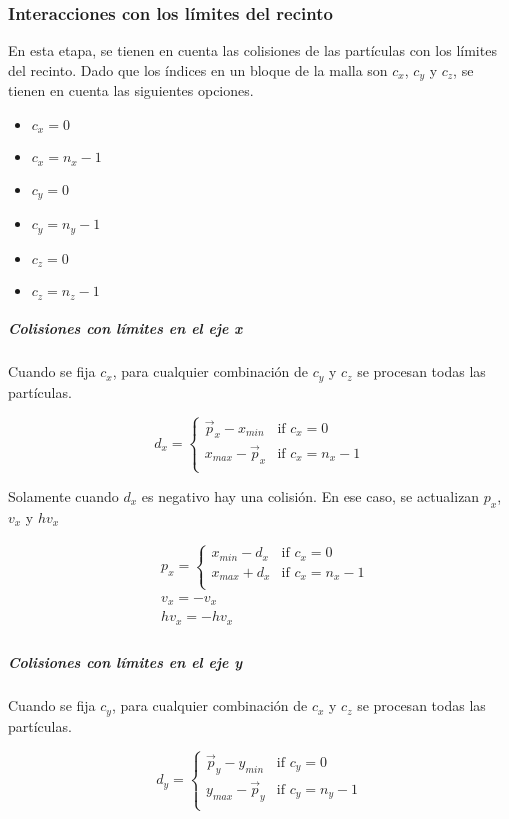 \subsubsection{Interacciones con los límites del recinto}

En esta etapa, se tienen en cuenta las colisiones de las partículas con
los límites del recinto. Dado que los índices en un bloque de la malla
son $c_x$, $c_y$ y $c_z$, se tienen en cuenta las siguientes opciones.

\begin{itemize}
\item $c_x=0$
\item $c_x=n_x-1$
\item $c_y=0$
\item $c_y=n_y-1$
\item $c_z=0$
\item $c_z=n_z-1$
\end{itemize}

\subparagraph{Colisiones con límites en el eje x}

Cuando se fija $c_x$, 
para cualquier combinación de $c_y$ y $c_z$ se procesan todas
las partículas.

\[
d_x =
\begin{cases}
  \vec{p}_x -x_{min}  & \text{if } c_x = 0\\
  x_{max} - \vec{p}_x & \text{if } c_x = n_x - 1\\
\end{cases}
\]

Solamente cuando $d_x$ es negativo hay una colisión. En ese caso, se actualizan
$p_x$, $v_x$ y $hv_x$

\[
\begin{split}
&p_x = 
  \begin{cases}
    x_{min} - d_x & \text{if } c_x = 0\\
    x_{max} + d_x & \text{if } c_x = n_x -1\\
  \end{cases}\\
&v_x = -v_x\\
&hv_x = -hv_x\\
\end{split}
\]

\subparagraph{Colisiones con límites en el eje y}

Cuando se fija $c_y$, 
para cualquier combinación de $c_x$ y $c_z$ se procesan todas
las partículas.

\[
d_y =
\begin{cases}
  \vec{p}_y - y_{min}  & \text{if } c_y = 0\\
  y_{max} - \vec{p}_y & \text{if } c_y = n_y - 1\\
\end{cases}
\]

